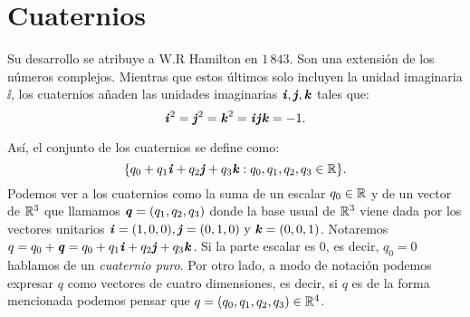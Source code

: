 	\section{Cuaternios}
		Su desarrollo se atribuye a W.R Hamilton en $ 1\,843 $.  Son una extensión de los números complejos. Mientras que estos últimos solo incluyen la unidad imaginaria $ \ii$, los cuaternios añaden las unidades imaginarias $ \textbf{\emph{i}}, \textbf{\emph{j}}, \textbf{\emph{k}} $ tales que:
		\begin{equation*}
			\textbf{\emph{i}}^2 = \textbf{\emph{j}}^2 = \textbf{\emph{k}}^2 = \textbf{\emph{i}}\textbf{\emph{j}}\textbf{\emph{k}} = -1.
		\end{equation*} 
		
		Así, el conjunto de los cuaternios se define como:
		\begin{equation*} 
			\lbrace q_0 + q_1 \textbf{\emph{i}} + q_2 \textbf{\emph{j}} + q_3 \textbf{\emph{k}} : q_0, q_1, q_2, q_3 \in \mathbb{R} \rbrace.
		\end{equation*}
		Podemos ver a los cuaternios como la suma de un escalar $ q_0 \in \mathbb{R}$ y de un vector de $ \mathbb{R}^3 $ que llamamos $ \textbf{\emph{q}} = (q_1,q_2,q_3)$ donde la base usual de $ \mathbb{R}^3 $ viene dada por los vectores unitarios $ \textbf{\emph{i}} =(1,0,0), \textbf{\emph{j}} = (0,1,0) \text{ y } \textbf{\emph{k}} = (0,0,1)$. Notaremos $
		q = q_0 + \textbf{\emph{q}} =  q_0 + q_1 \textbf{\emph{i}} + q_2 \textbf{\emph{j}} + q_3 \textbf{\emph{k}} $. Si la parte escalar es 0, es decir, $ q_0 = 0 $ hablamos de un \textit{cuaternio puro}. Por otro lado, a modo de notación podemos expresar $ q $ como vectores de cuatro dimensiones, es decir, si $ q $ es de la forma mencionada podemos pensar que $ q = (q_0, q_1, q_2, q_3) \in \mathbb{R}^4 $.
		
